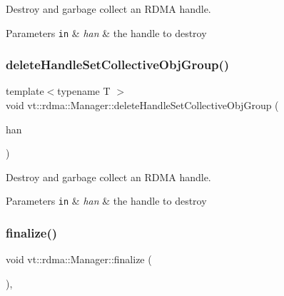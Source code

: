 Destroy and garbage collect an R\+D\+MA handle. 


\begin{DoxyParams}[1]{Parameters}
\mbox{\tt in}  & {\em han} & the handle to destroy \\
\hline
\end{DoxyParams}
\mbox{\label{structvt_1_1rdma_1_1_manager_a9b3b9bf148a8225295879481345e4af3}} 
\subsubsection{\texorpdfstring{delete\+Handle\+Set\+Collective\+Obj\+Group()}{deleteHandleSetCollectiveObjGroup()}}
{\footnotesize\ttfamily template$<$typename T $>$ \\
void vt\+::rdma\+::\+Manager\+::delete\+Handle\+Set\+Collective\+Obj\+Group (\begin{DoxyParamCaption}\item[{\hyperlink{structvt_1_1rdma_1_1_handle_set}{Handle\+Set}$<$ T $>$ \&}]{han }\end{DoxyParamCaption})}



Destroy and garbage collect an R\+D\+MA handle. 


\begin{DoxyParams}[1]{Parameters}
\mbox{\tt in}  & {\em han} & the handle to destroy \\
\hline
\end{DoxyParams}
\mbox{\label{structvt_1_1rdma_1_1_manager_ad4ff20cf1ba6e870326b20900e6eb581}} 
\subsubsection{\texorpdfstring{finalize()}{finalize()}}
{\footnotesize\ttfamily void vt\+::rdma\+::\+Manager\+::finalize (\begin{DoxyParamCaption}{ }\end{DoxyParamCaption})\hspace{0.3cm}{\ttfamily [override]}, {\ttfamily [virtual]}}



